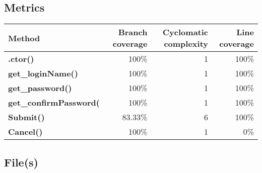 \documentclass[a4paper,landscape,10pt]{article}
\begin{document}
\subsection{Metrics}
\begin{longtable}[l]{|l|r|r|r|}
\hline
\textbf{Method} & \textbf{Branch coverage} & \textbf{Cyclomatic complexity} & \textbf{Line coverage}\\
\hline
\textbf{.ctor()} & 100\% & 1 & 100\%\\
\hline
\textbf{get\_loginName()} & 100\% & 1 & 100\%\\
\hline
\textbf{get\_password()} & 100\% & 1 & 100\%\\
\hline
\textbf{get\_confirmPassword(} & 100\% & 1 & 100\%\\
\hline
\textbf{Submit()} & 83.33\% & 6 & 100\%\\
\hline
\textbf{Cancel()} & 100\% & 1 & 0\%\\
\hline
\end{longtable}
\subsection{File(s)}
\end{document}
